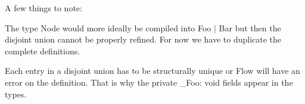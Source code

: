 A few things to note\+:


\begin{DoxyEnumerate}
\item The type {\ttfamily Node} would more ideally be compiled into {\ttfamily Foo $\vert$ Bar} but then the disjoint union cannot be properly refined. For now we have to duplicate the complete definitions.
\item Each entry in a disjoint union has to be structurally unique or Flow will have an error on the definition. That is why the private {\ttfamily \+\_\+\+Foo\+: void} fields appear in the types. 
\end{DoxyEnumerate}